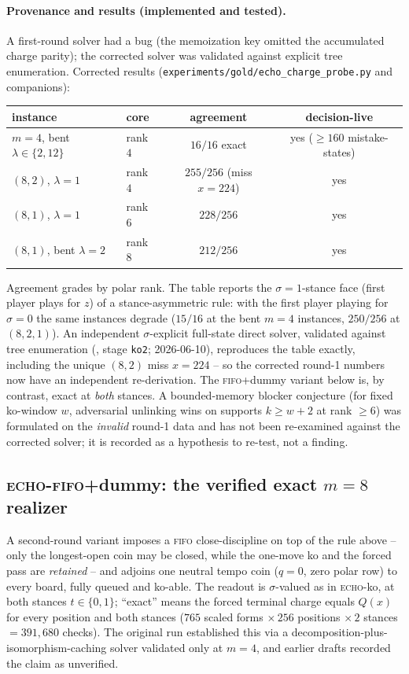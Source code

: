 \documentclass[11pt]{article}
\theoremstyle{plain}
\theoremstyle{definition}
\begin{document}
\paragraph{Provenance and results (implemented and tested).}
A first-round solver had a bug (the memoization key omitted the accumulated
charge parity); the corrected solver was validated against explicit tree
enumeration. Corrected results
(\texttt{experiments/gold/echo\_charge\_probe.py} and companions):
\begin{center}
\begin{tabular}{llcc}
\toprule
instance & core & agreement & decision-live \\
\midrule
$m=4$, bent $\lambda\in\{2,12\}$ & rank $4$ & $16/16$ exact & yes ($\geq160$ mistake-states) \\
$(8,2)$, $\lambda=1$ & rank $4$ & $255/256$ (miss $x=224$) & yes \\
$(8,1)$, $\lambda=1$ & rank $6$ & $228/256$ & yes \\
$(8,1)$, bent $\lambda=2$ & rank $8$ & $212/256$ & yes \\
\bottomrule
\end{tabular}
\end{center}
Agreement grades by polar rank. The table reports the $\sigma{=}1$-stance
face (first player plays for $z$) of a stance-asymmetric rule: with the
first player playing for $\sigma=0$ the same instances degrade ($15/16$ at
the bent $m=4$ instances, $250/256$ at $(8,2,1)$). An independent
$\sigma$-explicit full-state direct solver, validated against tree
enumeration (, stage \texttt{ko2};
2026-06-10), reproduces the table exactly, including the unique $(8,2)$
miss $x=224$ -- so the corrected round-1 numbers now have an independent
re-derivation. The \textsc{fifo}+dummy variant below is, by contrast, exact
at \emph{both} stances. A bounded-memory blocker conjecture (for fixed
ko-window $w$, adversarial unlinking wins on supports $k\geq w+2$ at rank
$\geq6$) was formulated on the \emph{invalid} round-1 data and has not been
re-examined against the corrected solver; it is recorded as a hypothesis to
re-test, not a finding.

\subsection{\textsc{echo}-\textsc{fifo}+dummy: the verified exact $m=8$
realizer}\label{sec:fifodummy}

A second-round variant imposes a \textsc{fifo} close-discipline on top of
the rule above -- only the longest-open coin may be closed, while the
one-move ko and the forced pass are \emph{retained} -- and adjoins one
neutral tempo coin ($q=0$, zero polar row) to every board, fully queued and
ko-able. The readout is $\sigma$-valued as in \textsc{echo}-ko, at both
stances $t\in\{0,1\}$; ``exact'' means the forced terminal charge equals
$Q(x)$ for every position and both stances ($765$ scaled forms
$\times\,256$ positions $\times\,2$ stances $=391{,}680$ checks). The
original run established this via a decomposition-plus-isomorphism-caching
solver validated only at $m=4$, and earlier drafts recorded the claim as
unverified.
\end{document}
